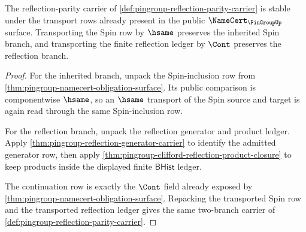 \begin{theorem}
\label{thm:pingroup-reflection-parity-stability}
The reflection-parity carrier of
\autoref{def:pingroup-reflection-parity-carrier} is stable under the
transport rows already present in the public $\NameCert_{\PinGroupUp}$
surface. Transporting the Spin row by $\hsame$ preserves the inherited Spin
branch, and transporting the finite reflection ledger by $\Cont$ preserves the
reflection branch.
\end{theorem}
\begin{proof}
For the inherited branch, unpack the Spin-inclusion row from
\autoref{thm:pingroup-namecert-obligation-surface}. Its public comparison is
componentwise $\hsame$, so an $\hsame$ transport of the Spin source and target
is again read through the same Spin-inclusion row.

For the reflection branch, unpack the reflection generator and product ledger.
Apply \autoref{thm:pingroup-reflection-generator-carrier} to identify the
admitted generator row, then apply
\autoref{thm:pingroup-clifford-reflection-product-closure} to keep products
inside the displayed finite $\mathsf{BHist}$ ledger.

The continuation row is exactly the $\Cont$ field already exposed by
\autoref{thm:pingroup-namecert-obligation-surface}. Repacking the transported
Spin row and the transported reflection ledger gives the same two-branch
carrier of \autoref{def:pingroup-reflection-parity-carrier}.
\end{proof}


